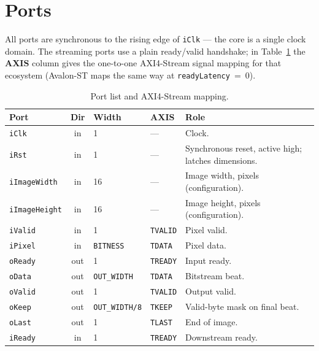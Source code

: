 \documentclass[10pt,a4paper]{article}
\begin{document}
\section{Ports}
All ports are synchronous to the rising edge of \texttt{iClk} --- the core is a
single clock domain. The streaming
ports use a plain ready/valid handshake; in Table~\ref{tab:ports} the
\textbf{AXIS} column gives the one-to-one AXI4-Stream signal mapping for that
ecosystem (Avalon-ST maps the same way at \texttt{readyLatency}~=~0).

\begin{table}[H]
  \centering
  \caption{Port list and AXI4-Stream mapping.}
  \label{tab:ports}
\begin{tabularx}{\textwidth}{@{}l c l l X@{}}
  \toprule
  \textbf{Port} & \textbf{Dir} & \textbf{Width} & \textbf{AXIS} & \textbf{Role} \\
  \midrule
  \texttt{iClk}        & in  & 1                       & ---             & Clock. \\
  \texttt{iRst}        & in  & 1                       & ---             & Synchronous reset, active high; latches dimensions. \\
  \texttt{iImageWidth} & in  & 16                      & --- & Image width, pixels (configuration). \\
  \texttt{iImageHeight}& in  & 16                      & --- & Image height, pixels (configuration). \\
  \texttt{iValid}      & in  & 1                       & \texttt{TVALID} & Pixel valid. \\
  \texttt{iPixel}      & in  & \texttt{BITNESS}        & \texttt{TDATA}  & Pixel data. \\
  \texttt{oReady}      & out & 1                       & \texttt{TREADY} & Input ready. \\
  \texttt{oData}       & out & \texttt{OUT\_WIDTH}     & \texttt{TDATA}  & Bitstream beat. \\
  \texttt{oValid}      & out & 1                       & \texttt{TVALID} & Output valid. \\
  \texttt{oKeep}       & out & \texttt{OUT\_WIDTH/8}   & \texttt{TKEEP}  & Valid-byte mask on final beat. \\
  \texttt{oLast}       & out & 1                       & \texttt{TLAST}  & End of image. \\
  \texttt{iReady}      & in  & 1                       & \texttt{TREADY} & Downstream ready. \\
  \bottomrule
\end{tabularx}
\end{table}
\end{document}
